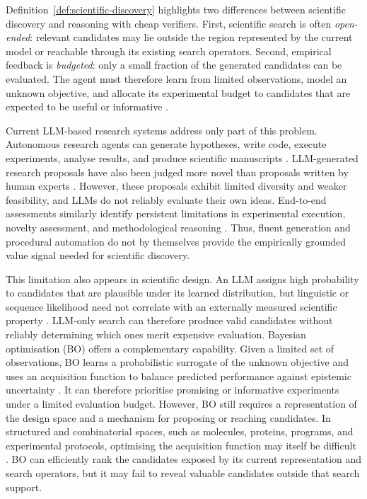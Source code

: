 Definition~\ref{def:scientific-discovery} highlights two differences between
scientific discovery and reasoning with cheap verifiers. First, scientific
search is often \emph{open-ended}: relevant candidates may lie outside the
region represented by the current model or reachable through its existing
search operators. Second, empirical feedback is \emph{budgeted}: only a small
fraction of the generated candidates can be evaluated. The agent must
therefore learn from limited observations, model an unknown objective, and
allocate its experimental budget to candidates that are expected to be useful
or informative
\citep{shahriari2016taking,frazier2018tutorial}.

Current LLM-based research systems address only part of this problem.
Autonomous research agents can generate hypotheses, write code, execute
experiments, analyse results, and produce scientific manuscripts
\citep{lu2024aiscientist}. LLM-generated research proposals have also been
judged more novel than proposals written by human experts
\citep{si2024novelideas}. However, these proposals exhibit limited diversity
and weaker feasibility, and LLMs do not reliably evaluate their own ideas.
End-to-end assessments similarly identify persistent limitations in
experimental execution, novelty assessment, and methodological reasoning
\citep{beel2025aiscientist,xu2026researchclawbench,
starace2025paperbench}. Thus, fluent generation and procedural automation do
not by themselves provide the empirically grounded value signal needed for
scientific discovery.

This limitation also appears in scientific design. An LLM assigns high
probability to candidates that are plausible under its learned distribution,
but linguistic or sequence likelihood need not correlate with an externally
measured scientific property
\citep{guptaLLMsBayesianOptimization2025,chang2025llinbo}. LLM-only search can therefore produce
valid candidates without reliably determining which ones merit expensive
evaluation. Bayesian optimisation (BO) offers a complementary capability. Given a limited
set of observations, BO learns a probabilistic surrogate of the unknown
objective and uses an acquisition function to balance predicted performance
against epistemic uncertainty
\citep{jonesEfficientGlobalOptimization1998,srinivas2010gaussian,shahriari2016taking,
frazier2018tutorial}. It can therefore prioritise promising or informative
experiments under a limited evaluation budget. However, BO still requires a
representation of the design space and a mechanism for proposing or reaching
candidates. In structured and combinatorial spaces, such as molecules,
proteins, programs, and experimental protocols, optimising the acquisition
function may itself be difficult
\citep{balandat2020botorch,griffiths2020constrained}. BO can efficiently rank
the candidates exposed by its current representation and search operators,
but it may fail to reveal valuable candidates outside that search support.

